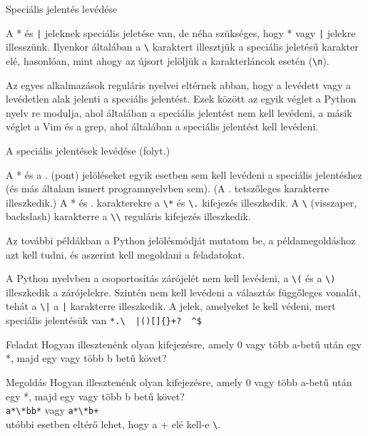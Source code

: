 \documentclass[
    ignorenonframetext
    ]{beamer}
\begin{document}
\begin{frame}[fragile]
    {Speciális jelentés levédése}

    A * és \verb"|" jeleknek speciális jeletése van, de néha szükséges, hogy *
    vagy \verb"|" jelekre illesszünk. Ilyenkor általában a \verb"\" karaktert
    illesztjük a speciális jeletésű karakter elé, hasonlóan, mint ahogy
    az újsort jelöljük a karakterláncok esetén (\verb!\n!).

    Az egyes alkalmazások reguláris nyelvei eltérnek abban, hogy a
    levédett vagy a levédetlen alak jelenti a speciális jelentést. Ezek
    között az egyik véglet a Python nyelv re modulja, ahol általában a
    speciális jelentést nem kell levédeni, a másik véglet a Vim és a
    grep, ahol általában a speciális jelentést kell levédeni.
\end{frame}

\begin{frame}[fragile]
    {A speciális jelentések levédése (folyt.)}


    A * és a . (pont) jelöléseket egyik esetben sem kell levédeni a
    speciális jelentéshez (és más általam ismert programnyelvben sem).
    (A .  tetszőleges karakterre illeszkedik.)  A * és . karakterekre a
    \verb"\*" és \verb"\." kifejezés illeszkedik. A \verb"\" (visszaper,
    backslash) karakterre a \verb"\\" reguláris kifejezés illeszkedik.

    Az további példákban a Python jelölésmódját mutatom be, a
    példamegoldáshoz azt kell tudni, és aszerint kell megoldani a
    feladatokat.

    A Python nyelvben a csoportosítás zárójelét nem kell levédeni, a
    \verb"\(" és a \verb"\)" illeszkedik a zárójelekre. Szintén nem kell
    levédeni a választás függőleges vonalát, tehát a \verb"\|"
    a \verb"|" karakterre illeszkedik. A jelek, amelyeket le
    kell védeni, mert speciális jelentésük van \verb"*.\  |()[]{}+?  ^$"
\end{frame}

\begin{frame}[fragile]
    {Feladat}
    Hogyan illesztenénk olyan kifejezésre, amely 0 vagy több a-betű után
    egy *, majd egy vagy több b betű követ?

    \megoldasjon
\end{frame}

\begin{frame}[fragile]
    {Megoldás}
    Hogyan illesztenénk olyan kifejezésre, amely 0 vagy több a-betű után
    egy *, majd egy vagy több b betű követ?\\
    \verb!a*\*bb*! \quad vagy \quad \verb!a*\*b+!\\
    utóbbi esetben eltérő lehet, hogy a + elé kell-e \verb|\|.
\end{frame}
\end{document}
